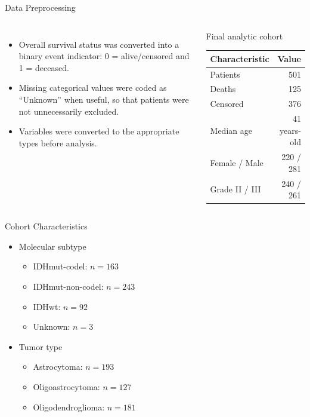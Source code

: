 \documentclass{beamer}
\begin{document}
\begin{frame}{Data Preprocessing}
\begin{columns}[T]
    \begin{itemize}
        \item Overall survival status was converted into a binary event indicator: 0 = alive/censored and 1 = deceased.
        \item Missing categorical values were coded as ``Unknown'' when useful, so that patients were not unnecessarily excluded.
        \item Variables were converted to the appropriate types before analysis.
    \end{itemize}
    \begin{block}{Final analytic cohort}
        \centering
        \begin{tabular}{lr}
        \toprule
        Characteristic & Value \\
        \midrule
        Patients & 501 \\
        Deaths & 125 \\
        Censored & 376 \\
        Median age & 41 years-old\\
        Female / Male & 220 / 281 \\
        Grade II / III & 240 / 261 \\
        \bottomrule
        \end{tabular}
    \end{block}
\end{columns}
\end{frame}

\begin{frame}{Cohort Characteristics}
\begin{itemize}
    \item Molecular subtype
        \begin{itemize}
            \item IDHmut-codel: $n = 163$
            \item IDHmut-non-codel: $n = 243$
            \item IDHwt: $n = 92$
            \item Unknown: $n = 3$
        \end{itemize}
    \item Tumor type
        \begin{itemize}
            \item Astrocytoma: $n = 193$
            \item Oligoastrocytoma: $n = 127$
            \item Oligodendroglioma: $n = 181$
        \end{itemize}
\end{itemize}
\end{frame}
\end{document}
